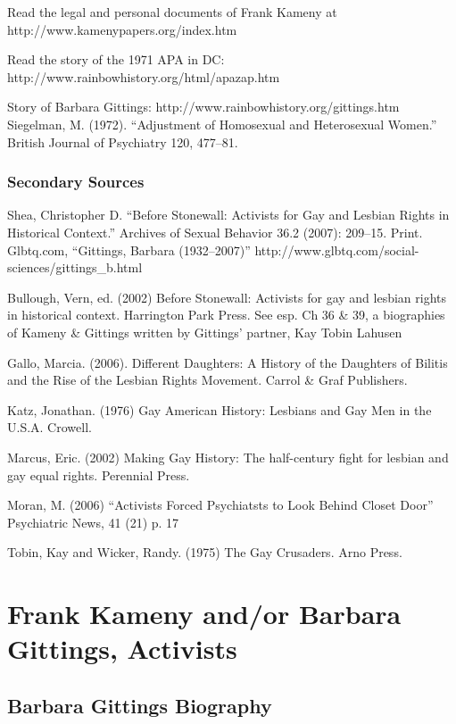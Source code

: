 \begin{refsection}
Read the legal and personal documents of Frank Kameny at http:\slash \slash www.kamenypapers.org\slash index.htm

Read the story of the 1971 APA in DC: http:\slash \slash www.rainbowhistory.org\slash html\slash apazap.htm

Story of Barbara Gittings: http:\slash \slash www.rainbowhistory.org\slash gittings.htm
Siegelman, M. (1972). “Adjustment of Homosexual and Heterosexual Women.” British Journal of Psychiatry 120, 477--81.

\subsection{Secondary Sources}
\label{secondarysources}

Shea, Christopher D. ``Before Stonewall: Activists for Gay and Lesbian Rights in Historical Context.'' Archives of Sexual Behavior 36.2 (2007): 209--15. Print.
Glbtq.com, “Gittings, Barbara (1932--2007)” http:\slash \slash www.glbtq.com\slash social-sciences\slash gittings\_b.html

Bullough, Vern, ed. (2002) Before Stonewall: Activists for gay and lesbian rights in historical context. Harrington Park Press. See esp. Ch 36 \& 39, a biographies of Kameny \& Gittings written by Gittings' partner, Kay Tobin Lahusen

Gallo, Marcia. (2006). Different Daughters: A History of the Daughters of Bilitis and the Rise of the Lesbian Rights Movement. Carrol \& Graf Publishers.

Katz, Jonathan. (1976) Gay American History: Lesbians and Gay Men in the U.S.A. Crowell.

Marcus, Eric. (2002) Making Gay History: The half-century fight for lesbian and gay equal rights. Perennial Press.

Moran, M. (2006) “Activists Forced Psychiatsts to Look Behind Closet Door” Psychiatric News, 41 (21) p. 17

Tobin, Kay and Wicker, Randy. (1975) The Gay Crusaders. Arno Press.

\chapter{Frank Kameny and\slash or Barbara Gittings, Activists}
\label{frankkamenyandorbarbaragittingsactivists}

\section{Barbara Gittings Biography}
\label{barbaragittingsbiography}


\end{refsection}
